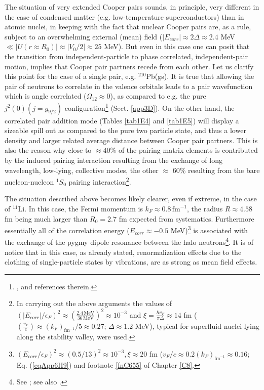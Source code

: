 The situation of very extended Cooper pairs sounds, in principle, very different in the case of condensed matter (e.g. low-temperature superconductors) than in atomic nuclei, in keeping with the fact that nuclear Cooper pairs are, as a rule, subject to an overwhelming external (mean) field ($|E_{corr}|\approx 2\Delta\approx2.4$ MeV $\ll |U(r\approx R_0)|\approx |V_0/2|\approx 25 $ MeV). But even in this case one can posit that  the transition from independent-particle to phase correlated, independent-pair motion, implies that Cooper pair partners recede from each other. Let us clarify this point for the case of a single pair, e.g. $^{210}$Pb(gs). It is true that allowing the pair of neutrons to correlate in the valence orbitals leads to a pair wavefunction which is angle correlated ($\Omega_{12}\approx 0$), as compared to e.g. the pure $j^2(0)(j=g_{9/2})$ configuration\footnote{\label{C4f17}\cite{Bertsch:67}, \cite{Ferreira:84,Matsuo:13} and references therein.} (Sect. \ref{app3D}). On the other hand, the correlated pair addition mode (Tables \ref{tab1E4} and \ref{tab1E5}) will display a sizeable spill out as compared to the pure two particle state, and thus a lower density and larger related average distance between Cooper pair partners. This is also the reason why close to $\approx 40$\% of the pairing matrix elements is contributed by the induced pairing interaction resulting from the exchange of long wavelength, low-lying, collective modes, the other $\approx$ 60\% resulting from the bare nucleon-nucleon $^1S_0$ pairing interaction\footnote{\label{f17C4} In carrying out the above arguments the values of $(|E_{corr}|/\epsilon_F)^2\approx \left(\frac{2.4 \,\text{MeV}}{36\,\text{MeV}}\right)^2\approx 10^{-3}$ and $\xi=\frac{\hbar v_F}{\pi\Delta}\approx 14$ fm ($(\frac{v_F}{c})\approx (k_F)_{\text{fm}^{-1}}/5\approx 0.27$; $\Delta\approx 1.2$ MeV), typical for superfluid nuclei lying along the stability valley, were used.}. 


The situation described above becomes likely clearer, even if extreme, in the case of $^{11}$Li. In this case, the Fermi momentum is $k_F\approx 0.8\, \text{fm}^{-1}$, the radius $R\approx 4.58 $fm being much larger than $R_0=2.7$ fm expected from systematics. Furthermore essentially all of the correlation energy ($E_{corr}\approx -0.5$ MeV)\footnote{\label{f18C4} $(E_{corr}/\epsilon_F)^2\approx (0.5/13)^2\approx 10^{-3}, \xi\approx 20 $ fm ($v_F/c\approx0.2(k_F)_{\text{fm}^{-1}}\approx 0.16$; Eq. (\ref{eqApp6H9}) and footnote \ref{fnC655} of Chapter \ref{C8}.}  is associated with the exchange of the  pygmy dipole resonance between the halo neutrons\footnote{See \cite{Barranco:01}; see also \cite{Broglia:19}.}. It is of notice that in this case, as already stated, renormalization effects due to the clothing of single-particle states by vibrations, are as strong as mean field effects.



